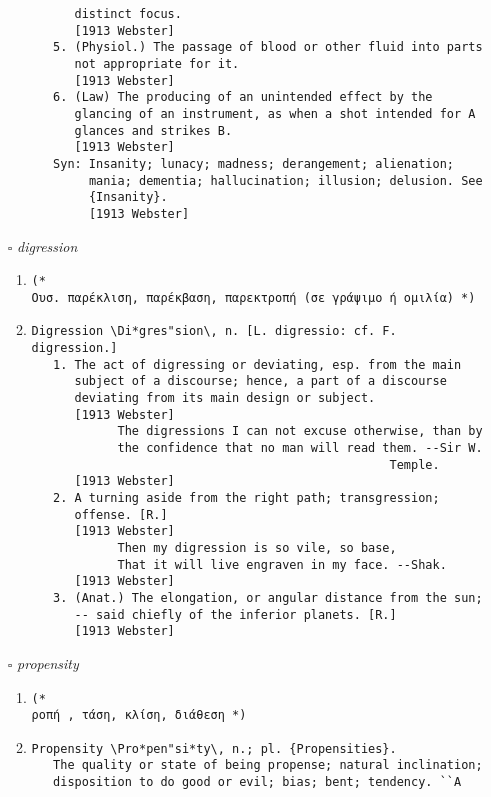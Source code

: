 \documentclass{article}
\begin{document}
\begin{itemize}
\begin{enumerate}
{\begin{lstlisting}
      distinct focus.
      [1913 Webster]
   5. (Physiol.) The passage of blood or other fluid into parts
      not appropriate for it.
      [1913 Webster]
   6. (Law) The producing of an unintended effect by the
      glancing of an instrument, as when a shot intended for A
      glances and strikes B.
      [1913 Webster]
   Syn: Insanity; lunacy; madness; derangement; alienation;
        mania; dementia; hallucination; illusion; delusion. See
        {Insanity}.
        [1913 Webster]
\end{lstlisting}}
\end{enumerate}
\item[$\square$] \emph{ digression }
\begin{enumerate}
\item{
\begin{lstlisting}
(* 
Ουσ. παρέκλιση, παρέκβαση, παρεκτροπή (σε γράψιμο ή ομιλία) *)
\end{lstlisting}}
\item{
\begin{lstlisting}
Digression \Di*gres"sion\, n. [L. digressio: cf. F. digression.]
   1. The act of digressing or deviating, esp. from the main
      subject of a discourse; hence, a part of a discourse
      deviating from its main design or subject.
      [1913 Webster]
            The digressions I can not excuse otherwise, than by
            the confidence that no man will read them. --Sir W.
                                                  Temple.
      [1913 Webster]
   2. A turning aside from the right path; transgression;
      offense. [R.]
      [1913 Webster]
            Then my digression is so vile, so base,
            That it will live engraven in my face. --Shak.
      [1913 Webster]
   3. (Anat.) The elongation, or angular distance from the sun;
      -- said chiefly of the inferior planets. [R.]
      [1913 Webster]
\end{lstlisting}}
\end{enumerate}
\item[$\square$] \emph{ propensity }
\begin{enumerate}
\item{
\begin{lstlisting}
(* 
ροπή , τάση, κλίση, διάθεση *)
\end{lstlisting}}
\item{
\begin{lstlisting}
Propensity \Pro*pen"si*ty\, n.; pl. {Propensities}.
   The quality or state of being propense; natural inclination;
   disposition to do good or evil; bias; bent; tendency. ``A

\end{lstlisting}}
\end{enumerate}
\end{itemize}
\end{document}
